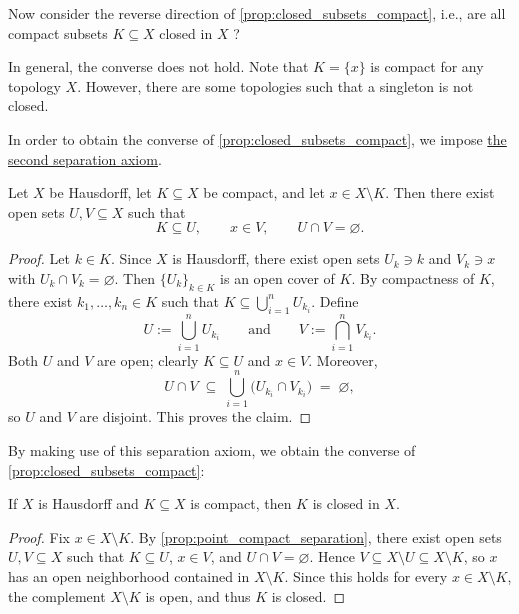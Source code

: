 Now consider the reverse direction of \autoref{prop:closed_subsets_compact}, i.e., are all compact subsets \(K \subseteq  X\) closed in \(X\) ?

In general, the converse does not hold. Note that \(K = \{ x\}\) is compact for any topology \(X\). However, there are some topologies such that a singleton is not closed.

In order to obtain the converse of \autoref{prop:closed_subsets_compact}, we impose \hyperlink{def:Hausdorff}{the second separation axiom}.

\begin{proposition}
\label{prop:point_compact_separation}
Let \(X\) be Hausdorff, let \(K\subseteq X\) be compact, and let \(x\in X\setminus K\).
Then there exist open sets \(U,V\subseteq X\) such that
\[
K\subseteq U,\qquad x\in V,\qquad U\cap V=\varnothing.
\]
\end{proposition}

\begin{proof}
Let \(k \in K\). Since \(X\) is Hausdorff, there exist open sets \(U_k \ni k\) and \(V_k \ni x\) with
\(U_k \cap V_k = \varnothing\).
Then \(\{U_k\}_{k \in K}\) is an open cover of \(K\).
By compactness of \(K\), there exist \(k_1,\dots,k_n \in K\) such that
\(K \subseteq \bigcup_{i=1}^n U_{k_i}\).
Define
\[
U := \bigcup_{i=1}^n U_{k_i}
\qquad\text{and}\qquad
V := \bigcap_{i=1}^n V_{k_i}.
\]
Both \(U\) and \(V\) are open; clearly \(K \subseteq U\) and \(x \in V\).
Moreover,
\[
U \cap V \;\subseteq\; \bigcup_{i=1}^n \bigl(U_{k_i} \cap V_{k_i}\bigr) \;=\; \varnothing,
\]
so \(U\) and \(V\) are disjoint.
This proves the claim.
\end{proof}

By making use of this separation axiom, we obtain the converse of \autoref{prop:closed_subsets_compact}:

\begin{corollary}\label{cor:compact_closed_in_Hausdorff}
If \(X\) is Hausdorff and \(K \subseteq X\) is compact, then \(K\) is closed in \(X\).
\end{corollary}

\begin{proof}
Fix \(x \in X \setminus K\).
By \autoref{prop:point_compact_separation}, there exist open sets \(U,V \subseteq X\) such that
\(K \subseteq U\), \(x \in V\), and \(U \cap V = \varnothing\).
Hence \(V \subseteq X \setminus U \subseteq X \setminus K\),
so \(x\) has an open neighborhood contained in \(X \setminus K\).
Since this holds for every \(x \in X \setminus K\), the complement \(X \setminus K\) is open, and thus \(K\) is closed.
\end{proof}

